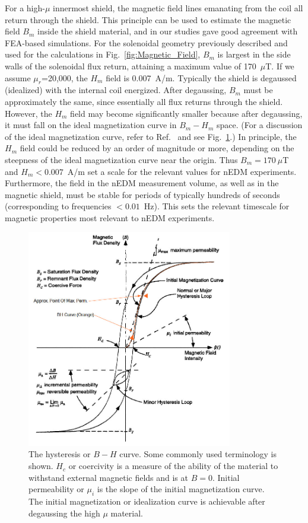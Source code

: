 For a high-$\mu$ innermost shield, the magnetic field lines emanating
from the coil all return through the shield.  This principle can be
used to estimate the magnetic field $B_m$ inside the shield material,
and in our studies gave good agreement with FEA-based simulations.
For the solenoidal geometry previously described and used for the
calculations in Fig.~\ref{fig:Magnetic_Field}, $B_m$ is largest in the
side walls of the solenoidal flux return, attaining a maximum value of
170~$\mu$T.  If we assume $\mu_r$=20,000, the $H_m$ field is
0.007~A/m.  Typically the shield is degaussed (idealized) with the
internal coil energized. After degaussing, $B_m$ must be approximately
the same, since essentially all flux returns through the shield.
However, the $H_m$ field may become significantly smaller because
after degaussing, it must fall on the ideal magnetization curve in
$B_m-H_m$ space.  (For a discussion of the ideal magnetization curve,
refer to Ref.~\cite{bozorth1993ferromagnetism} and see
Fig.~\ref{fig:bh}.)  In principle, the $H_m$ field could be reduced by
an order of magnitude or more, depending on the steepness of the ideal
magnetization curve near the origin.  Thus $B_m=170~\mu$T and
$H_m<0.007$~A/m set a scale for the relevant values for nEDM
experiments.  Furthermore, the field in the nEDM measurement volume,
as well as in the magnetic shield, must be stable for periods of
typically hundreds of seconds (corresponding to frequencies
$<0.01$~Hz). This sets the relevant timescale for magnetic properties
most relevant to nEDM experiments.


\begin{figure}[h!]
  \centering
  \includegraphics[width=0.8\textwidth]{bh.jpg}
  \caption{The hysteresis or $B-H$ curve. Some commonly used
    terminology is shown. $H_c$ or coercivity is a measure of the
    ability of the material to withstand external magnetic fields and
    is at $B=0$. Initial permeability or $\mu_i$ is the slope of the
    initial magnetization curve. The initial magnetization or
    idealization curve is achievable after degaussing the high $\mu$
    material. }
  \label{fig:bh}
\end{figure}
